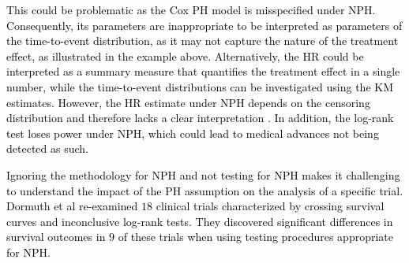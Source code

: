 \documentclass{article}
\newcommand{\NEW}[2][black]{\textcolor{#1}{#2}}
\begin{document}

\noindent \NEW{
This could be problematic as the Cox PH model is misspecified under NPH.
Consequently, its parameters are inappropriate to be interpreted as parameters of the time-to-event distribution,
as it may not capture the nature of the treatment effect, as illustrated in the example above.
Alternatively, the HR could be interpreted as a summary measure that quantifies the treatment effect in a single number, while the time-to-event distributions can be investigated using the KM estimates.
However, the HR estimate under NPH depends on the censoring distribution and therefore lacks a clear interpretation \cite{Xu.2000}.
In addition, the log-rank test loses power under NPH, which could lead to medical advances not being detected as such.}

\noindent \NEW{Ignoring the methodology for NPH and not testing for NPH makes it challenging to understand the impact of the PH assumption on the analysis of a specific trial. 
Dormuth et al \cite{Dormuth.2022} re-examined $18$ clinical trials characterized by crossing survival curves and inconclusive log-rank tests. They discovered significant differences in survival outcomes in $9$ of these trials when using testing procedures appropriate for NPH.}


\end{document}
